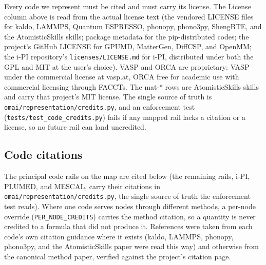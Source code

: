 \documentclass[11pt,a4paper]{article}
\begin{document}
Every code we represent must be cited and must carry its license. The License
column above is read from the actual license text (the vendored LICENSE files
for kaldo, LAMMPS, Quantum ESPRESSO, phonopy, phono3py, ShengBTE, and the
AtomisticSkills skills; package metadata for the pip-distributed codes; the
project's GitHub LICENSE for GPUMD, MatterGen, DiffCSP, and OpenMM; the i-PI
repository's \texttt{licenses/LICENSE.md} for i-PI, distributed under both the
GPL and MIT at the user's choice). VASP and
ORCA are proprietary: VASP under the commercial license at vasp.at, ORCA free
for academic use with commercial licensing through FACCTs. The mat-* rows are
AtomisticSkills skills and carry that project's MIT license. The single source
of truth is \texttt{omai/representation/credits.py}, and an enforcement test
(\texttt{tests/test\_code\_credits.py}) fails if any mapped rail lacks a
citation or a license, so no future rail can land uncredited.

\subsection{Code citations}
\label{sec:code-citations}

The principal code rails on the map are cited below (the remaining rails,
i-PI, PLUMED, and MESCAL, carry their citations in
\texttt{omai/representation/credits.py}, the single source of truth the
enforcement test reads). Where one code serves nodes through different
methods, a per-node override (\texttt{PER\_NODE\_CREDITS}) carries the
method citation, so a quantity is never credited to a formula that did not
produce it. References were taken from each code's
own citation guidance where it exists (kaldo, LAMMPS, phonopy, phono3py, and the
AtomisticSkills paper were read this way) and otherwise from the canonical method
paper, verified against the project's citation page.
\end{document}
